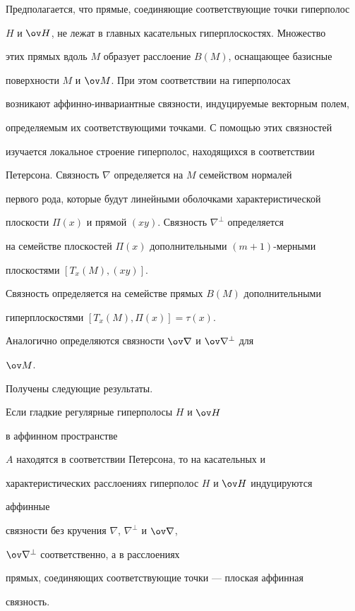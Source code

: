  


Предполагается, что прямые, соединяющие соответствующие точки гиперполос 


$H$ и $\ov H$, не лежат в главных касательных гиперплоскостях. Множество 


этих прямых вдоль $M$ образует расслоение $B(M)$, оснащающее базисные 


поверхности $M$ и $\ov M$. При этом соответствии на гиперполосах 


возникают аффинно-инвариантные связности, индуцируемые векторным полем, 


определяемым их соответствующими точками. С помощью этих связностей 


изучается локальное строение гиперполос, находящихся в соответствии 


Петерсона. Связность $\nabla$ определяется на $M$ семейством нормалей 


первого рода, которые будут линейными оболочками характеристической 


плоскости $\Pi(x)$ и прямой $(xy)$. Связность $\nabla^\bot$ определяется 


на семействе плоскостей $\Pi(x)$ дополнительными $(m+1)$-мерными 


плоскостями $[T_x(M),(xy)]$. 


 


Связность определяется на семействе прямых $B(M)$ дополнительными 


гиперплоскостями $[T_x(M),\Pi(x)]=\tau(x)$. 


 


Аналогично определяются связности $\ov\nabla$ и $\ov\nabla^\bot$ для 


$\ov M$. 


Получены следующие результаты. 


 


\begin{thm} 


Если гладкие регулярные гиперполосы $H$ и $\ov H$ 


в аффинном пространстве 


$A$ находятся в соответствии Петерсона, то на касательных и 


характеристических расслоениях гиперполос $H$ и $\ov H$ индуцируются 


аффинные 


связности без кручения $\nabla$, $\nabla^\bot$ и $\ov\nabla$, 


$\ov\nabla^\bot$ соответственно, а в расслоениях 


прямых, соединяющих соответствующие точки --- плоская аффинная 


связность. 


\end{thm} 


